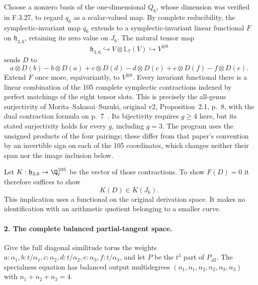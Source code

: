 Choose a nonzero basis of the one-dimensional $Q_6$,
whose dimension was verified in F.3.27, to regard $q_6$
as a scalar-valued map. By complete reducibility, the
symplectic-invariant map $q_6$ extends to a symplectic-invariant linear
functional $F$ on $\mathfrak h_{3,6}$, retaining
its zero value on $J_6$. The natural tensor map
\[
 \mathfrak h_{3,6}\hookrightarrow V\otimes\mathbb L_7(V)
                      \hookrightarrow V^{\otimes8}
\]
sends $D$ to
\[
 a\otimes D(b)-b\otimes D(a)
 +c\otimes D(d)-d\otimes D(c)
 +e\otimes D(f)-f\otimes D(e).
\]
Extend $F$ once more, equivariantly, to $V^{\otimes8}$.
Every invariant functional there is a linear
combination of the 105 complete symplectic
contractions indexed by perfect matchings of
the eight tensor slots. This is precisely the
all-genus surjectivity of Morita--Sakasai--Suzuki,
original v2, Proposition~2.1, p.~8, with the
dual contraction formula on p.~7~\cite{AuditMoritaSakasaiSuzuki2015v2}. Its bijectivity
requires $g\geq4$ here, but its stated surjectivity
holds for every $g$, including $g=3$.
The program uses the unsigned products of the
four pairings; these differ from that paper's
convention by an invertible sign on each of
the 105 coordinates, which changes neither
their span nor the image inclusion below.

Let $K:\mathfrak h_{3,6}\to\Q_\ell^{105}$ be
the vector of those contractions. To show
$F(D)=0$ it therefore suffices to show
\[
                    K(D)\in K(J_6).                       \tag{PT.3}
\]
This implication uses a functional on the original
derivation space. It makes no identification with
an arithmetic quotient belonging to a smaller curve.

\paragraph{2. The complete balanced partial-tangent space.}
Give the full diagonal similitude torus the weights
$a:\alpha_1,b:t/\alpha_1,c:\alpha_2,d:t/\alpha_2,
e:\alpha_3,f:t/\alpha_3$, and let $P$ be the
$t^3$ part of $P_{\mathrm{all}}$.
The specialness equation has balanced output
multidegrees $(n_1,n_1,n_2,n_2,n_3,n_3)$ with
$n_1+n_2+n_3=4$.

